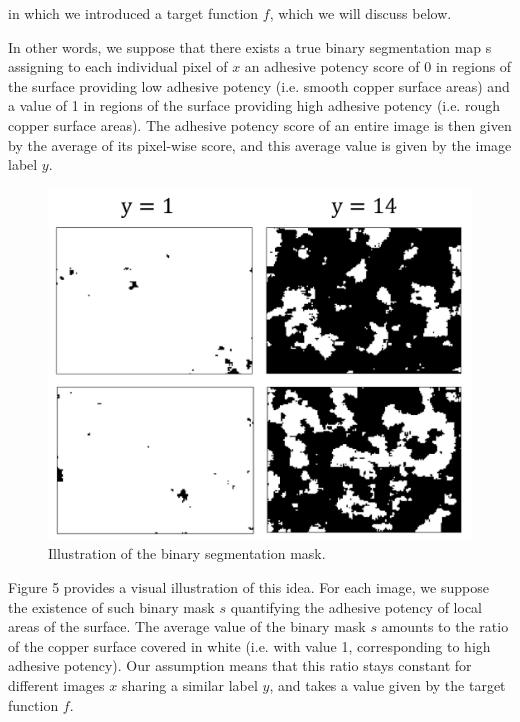 \documentclass[10pt,twocolumn,letterpaper]{article}
\begin{document}
in which we introduced a target function $f$, which we will discuss below.

In other words, we suppose that there exists a true binary segmentation map
s assigning to each individual pixel of $x$ an adhesive potency score of 0 
in regions of the surface providing low adhesive potency (i.e. smooth copper surface areas)
and a value of 1 in regions of the surface providing high adhesive potency (i.e. rough copper surface areas).
The adhesive potency score of an entire image is then given by the average of its pixel-wise score,
and this average value is given by the image label $y$.

\begin{figure}[h]
	\centering
	\includegraphics[width=0.9\linewidth]{"./figures/Figure5"}
	\caption{
		Illustration of the binary segmentation mask.
	}
\end{figure}

Figure 5 provides a visual illustration of this idea.
For each image, we suppose the existence of such binary mask $s$
quantifying the adhesive potency of local areas of the surface.
The average value of the binary mask $s$ amounts to the ratio of the
copper surface covered in white (i.e. with value 1, corresponding to high adhesive potency).
Our assumption means that this ratio stays constant for different images $x$ sharing a similar label $y$,
and takes a value given by the target function $f$.
\end{document}
